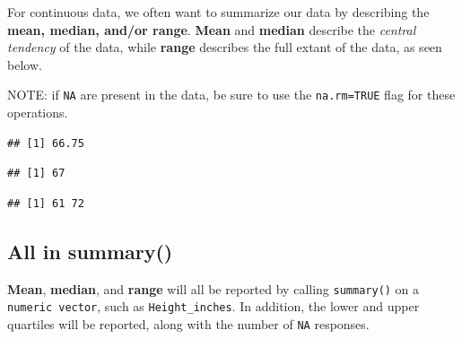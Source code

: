 \documentclass[
]{book}
\newenvironment{Shaded}{\begin{snugshade}}{\end{snugshade}}
\newcommand{\AttributeTok}[1]{\textcolor[rgb]{0.77,0.63,0.00}{#1}}
\newcommand{\FunctionTok}[1]{\textcolor[rgb]{0.00,0.00,0.00}{#1}}
\newcommand{\NormalTok}[1]{#1}
\newcommand{\SpecialCharTok}[1]{\textcolor[rgb]{0.00,0.00,0.00}{#1}}
\begin{document}
For continuous data, we often want to summarize our data by describing the \textbf{mean, median, and/or range}. \textbf{Mean} and \textbf{median} describe the \emph{central tendency} of the data, while \textbf{range} describes the full extant of the data, as seen below.

NOTE: if \texttt{NA} are present in the data, be sure to use the \texttt{na.rm=TRUE} flag for these operations.

\begin{Shaded}
\end{Shaded}

\begin{verbatim}
## [1] 66.75
\end{verbatim}

\begin{Shaded}
\end{Shaded}

\begin{verbatim}
## [1] 67
\end{verbatim}

\begin{Shaded}
\end{Shaded}

\begin{verbatim}
## [1] 61 72
\end{verbatim}

\hypertarget{all-in-summary}{%
\subsection*{All in summary()}\label{all-in-summary}}

\textbf{Mean}, \textbf{median}, and \textbf{range} will all be reported by calling \texttt{summary()} on a \texttt{numeric\ vector}, such as \texttt{Height\_inches}. In addition, the lower and upper quartiles will be reported, along with the number of \texttt{NA} responses.
\end{document}
